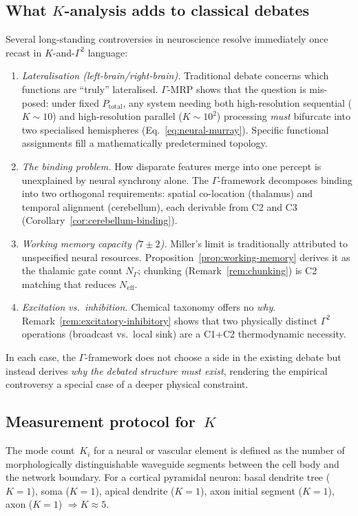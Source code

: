 \documentclass[aps,pre,twocolumn,superscriptaddress,floatfix]{revtex4-2}
\begin{document}
\subsection{What $K$-analysis adds to classical debates}

Several long-standing controversies in neuroscience
resolve immediately once recast in $K$-and-$\Gamma^2$
language:
\begin{enumerate}
  \item \emph{Lateralisation (left-brain/right-brain).}
    Traditional debate concerns which functions are
    ``truly'' lateralised.
    $\Gamma$-MRP shows that the question is
    mis-posed: under fixed $P_{\text{total}}$,
    any system needing both high-resolution
    sequential ($K \sim 10$) and high-resolution
    parallel ($K \sim 10^2$) processing
    \emph{must} bifurcate into two specialised
    hemispheres (Eq.~\ref{eq:neural-murray}).
    Specific functional assignments fill a
    mathematically predetermined topology.
  \item \emph{The binding problem.}
    How disparate features merge into one percept
    is unexplained by neural synchrony alone.
    The $\Gamma$-framework decomposes binding into
    two orthogonal requirements: spatial
    co-location (thalamus) and temporal alignment
    (cerebellum), each derivable from C2 and C3
    (Corollary~\ref{cor:cerebellum-binding}).
  \item \emph{Working memory capacity ($7 \pm 2$).}
    Miller's limit is traditionally
    attributed to unspecified neural resources.
    Proposition~\ref{prop:working-memory} derives
    it as the thalamic gate count $N_\Gamma$;
    chunking (Remark~\ref{rem:chunking}) is C2
    matching that reduces $N_{\text{eff}}$.
  \item \emph{Excitation vs.\ inhibition.}
    Chemical taxonomy offers no
    \emph{why}.
    Remark~\ref{rem:excitatory-inhibitory} shows
    that two physically distinct $\Gamma^2$
    operations (broadcast vs.\ local sink) are a
    C1+C2 thermodynamic necessity.
\end{enumerate}
In each case, the $\Gamma$-framework does not choose
a side in the existing debate but instead derives
\emph{why the debated structure must exist},
rendering the empirical controversy a special case of
a deeper physical constraint.

\subsection{Measurement protocol for~$K$}
\label{sec:K-protocol}
The mode count~$K_i$ for a neural or vascular element
is defined as the number of morphologically
distinguishable waveguide segments between the cell body
and the network boundary.
For a cortical pyramidal neuron:
basal dendrite tree ($K=1$), soma ($K=1$),
apical dendrite ($K=1$), axon initial segment ($K=1$),
axon ($K=1$) $\Rightarrow K \approx 5$.
\end{document}
